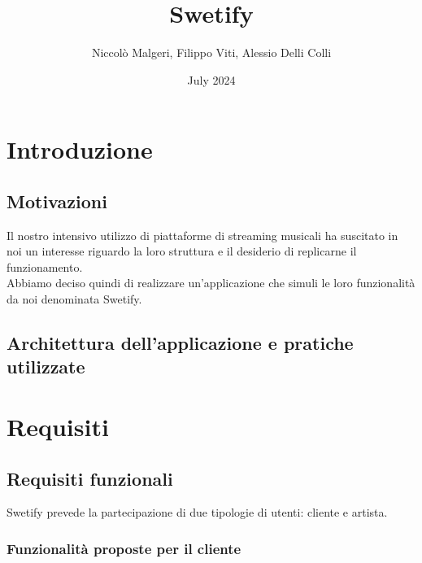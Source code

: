 \documentclass{article}
\title{Swetify}
\author{Niccolò Malgeri, Filippo Viti, Alessio Delli Colli}
\date{July 2024}
\begin{document}
  \maketitle

  \tableofcontents
  \newpage


  \section{Introduzione}

  \subsection{Motivazioni}
  Il nostro intensivo utilizzo di piattaforme di streaming musicali ha suscitato in noi un interesse riguardo
  la loro struttura e il desiderio di replicarne il funzionamento.\\
  Abbiamo deciso quindi di realizzare un'applicazione che simuli le loro funzionalità da noi denominata Swetify.

  \subsection{Architettura dell'applicazione e pratiche utilizzate}


  \section{Requisiti}

  \subsection{Requisiti funzionali}
  \label{sec:reqFunc}
  Swetify prevede la partecipazione di due tipologie di utenti: cliente e artista.

  \subsubsection{Funzionalità proposte per il cliente}
\end{document}

